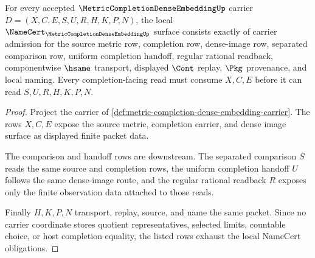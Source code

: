 \begin{theorem}
\label{thm:metric-completion-dense-embedding-namecert-obligations}
For every accepted $\MetricCompletionDenseEmbeddingUp$ carrier $D=(X,C,E,S,U,R,H,K,P,N)$, the local $\NameCert_{\MetricCompletionDenseEmbeddingUp}$ surface consists exactly of carrier admission for the source metric row, completion row, dense-image row, separated comparison row, uniform completion handoff, regular rational readback, componentwise $\hsame$ transport, displayed $\Cont$ replay, $\Pkg$ provenance, and local naming. Every completion-facing read must consume $X,C,E$ before it can read $S,U,R,H,K,P,N$.
\end{theorem}
\begin{proof}
Project the carrier of \autoref{def:metric-completion-dense-embedding-carrier}. The rows $X,C,E$ expose the source metric, completion carrier, and dense image surface as displayed finite packet data.

The comparison and handoff rows are downstream. The separated comparison $S$ reads the same source and completion rows, the uniform completion handoff $U$ follows the same dense-image route, and the regular rational readback $R$ exposes only the finite observation data attached to those reads.

Finally $H,K,P,N$ transport, replay, source, and name the same packet. Since no carrier coordinate stores quotient representatives, selected limits, countable choice, or host completion equality, the listed rows exhaust the local NameCert obligations.
\end{proof}

